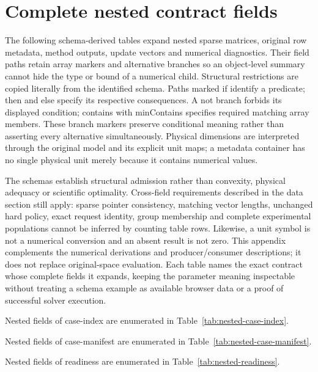 \appendix

\section{Complete nested contract fields}\label{sec:contract-appendix}

The following schema-derived tables expand nested sparse matrices, original row
metadata, method outputs, update vectors and numerical diagnostics. Their field
paths retain array markers and alternative branches so an object-level summary
cannot hide the type or bound of a numerical child. Structural restrictions are
copied literally from the identified schema. Paths marked if identify a predicate;
then and else specify its respective consequences. A not branch forbids its
displayed condition; contains with minContains specifies required matching
array members. These branch markers preserve conditional meaning rather than
asserting every alternative simultaneously. Physical dimensions are interpreted
through the original model and its explicit unit maps; a metadata container has
no single physical unit merely because it contains numerical values.

The schemas establish structural admission rather than convexity, physical
adequacy or scientific optimality. Cross-field requirements described in the
data section still apply: sparse pointer consistency, matching vector lengths,
unchanged hard policy, exact request identity, group membership and complete
experimental populations cannot be inferred by counting table rows. Likewise,
a unit symbol is not a numerical conversion and an absent result is not zero.
This appendix complements the numerical derivations and producer/consumer
descriptions; it does not replace original-space evaluation. Each table names
the exact contract whose complete fields it expands, keeping the parameter
meaning inspectable without treating a schema example as available browser
data or a proof of successful solver execution.

Nested fields of case-index are enumerated in Table~\ref{tab:nested-case-index}.



Nested fields of case-manifest are enumerated in Table~\ref{tab:nested-case-manifest}.



Nested fields of readiness are enumerated in Table~\ref{tab:nested-readiness}.

